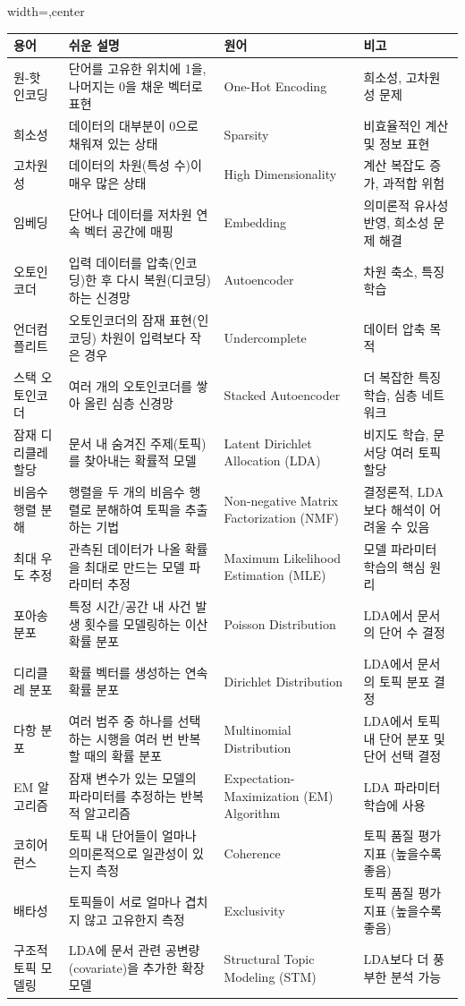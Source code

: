 \documentclass[11pt,a4paper]{article}
\theoremstyle{definition}
\begin{document}
\begin{adjustbox}{width=\textwidth,center}
\begin{tabular}{llll}
\toprule
\textbf{용어} & \textbf{쉬운 설명} & \textbf{원어} & \textbf{비고} \\
\midrule
원-핫 인코딩 & 단어를 고유한 위치에 1을, 나머지는 0을 채운 벡터로 표현 & One-Hot Encoding & 희소성, 고차원성 문제 \\
희소성 & 데이터의 대부분이 0으로 채워져 있는 상태 & Sparsity & 비효율적인 계산 및 정보 표현 \\
고차원성 & 데이터의 차원(특성 수)이 매우 많은 상태 & High Dimensionality & 계산 복잡도 증가, 과적합 위험 \\
임베딩 & 단어나 데이터를 저차원 연속 벡터 공간에 매핑 & Embedding & 의미론적 유사성 반영, 희소성 문제 해결 \\
오토인코더 & 입력 데이터를 압축(인코딩)한 후 다시 복원(디코딩)하는 신경망 & Autoencoder & 차원 축소, 특징 학습 \\
언더컴플리트 & 오토인코더의 잠재 표현(인코딩) 차원이 입력보다 작은 경우 & Undercomplete & 데이터 압축 목적 \\
스택 오토인코더 & 여러 개의 오토인코더를 쌓아 올린 심층 신경망 & Stacked Autoencoder & 더 복잡한 특징 학습, 심층 네트워크 \\
잠재 디리클레 할당 & 문서 내 숨겨진 주제(토픽)를 찾아내는 확률적 모델 & Latent Dirichlet Allocation (LDA) & 비지도 학습, 문서당 여러 토픽 할당 \\
비음수 행렬 분해 & 행렬을 두 개의 비음수 행렬로 분해하여 토픽을 추출하는 기법 & Non-negative Matrix Factorization (NMF) & 결정론적, LDA보다 해석이 어려울 수 있음 \\
최대 우도 추정 & 관측된 데이터가 나올 확률을 최대로 만드는 모델 파라미터 추정 & Maximum Likelihood Estimation (MLE) & 모델 파라미터 학습의 핵심 원리 \\
포아송 분포 & 특정 시간/공간 내 사건 발생 횟수를 모델링하는 이산 확률 분포 & Poisson Distribution & LDA에서 문서의 단어 수 결정 \\
디리클레 분포 & 확률 벡터를 생성하는 연속 확률 분포 & Dirichlet Distribution & LDA에서 문서의 토픽 분포 결정 \\
다항 분포 & 여러 범주 중 하나를 선택하는 시행을 여러 번 반복할 때의 확률 분포 & Multinomial Distribution & LDA에서 토픽 내 단어 분포 및 단어 선택 결정 \\
EM 알고리즘 & 잠재 변수가 있는 모델의 파라미터를 추정하는 반복적 알고리즘 & Expectation-Maximization (EM) Algorithm & LDA 파라미터 학습에 사용 \\
코히어런스 & 토픽 내 단어들이 얼마나 의미론적으로 일관성이 있는지 측정 & Coherence & 토픽 품질 평가 지표 (높을수록 좋음) \\
배타성 & 토픽들이 서로 얼마나 겹치지 않고 고유한지 측정 & Exclusivity & 토픽 품질 평가 지표 (높을수록 좋음) \\
구조적 토픽 모델링 & LDA에 문서 관련 공변량(covariate)을 추가한 확장 모델 & Structural Topic Modeling (STM) & LDA보다 더 풍부한 분석 가능 \\
\bottomrule
\end{tabular}
\end{adjustbox}
\end{document}
